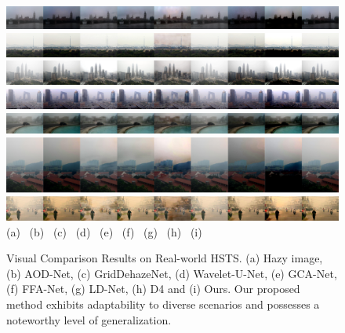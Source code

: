 \documentclass[lettersize,journal]{IEEEtran}
\begin{document}
\begin{figure}[pht]
    \centering
    \includegraphics[width=\textwidth]{hsts_2.jpg}
    \includegraphics[width=\textwidth]{hsts_3.jpg}
    \includegraphics[width=\textwidth]{hsts_4.jpg}
    \includegraphics[width=\textwidth]{hsts_6.jpg}
    \includegraphics[width=\textwidth]{hsts_7.jpg}
    \includegraphics[width=\textwidth]{hsts_8.jpg}
    \includegraphics[width=\textwidth]{hsts_9.jpg}
    (a) \qquad\quad\;\;\;\ (b) \qquad\quad\;\;\;\ (c) \qquad\quad\;\;\;\ (d) \qquad\quad\;\;\;\, (e) \qquad\quad\;\;\;\, (f) \qquad\quad\;\;\;\ (g) \qquad\quad\;\;\;\ (h) \qquad\quad\;\;\;\ (i)
    \caption{Visual Comparison Results on Real-world HSTS. (a) Hazy image, (b) AOD-Net\cite{li2017aod}, (c) GridDehazeNet\cite{liu2019griddehazenet}, (d) Wavelet-U-Net\cite{yang2019wavelet}, (e) GCA-Net\cite{chen2019gated}, (f) FFA-Net\cite{qin2020ffa}, (g) LD-Net\cite{ullah2021light}, (h) D4\cite{yang2022d4} and (i) Ours. Our proposed method exhibits adaptability to diverse scenarios and possesses a noteworthy level of generalization.}
    \label{hsts}
\end{figure}
\end{document}
